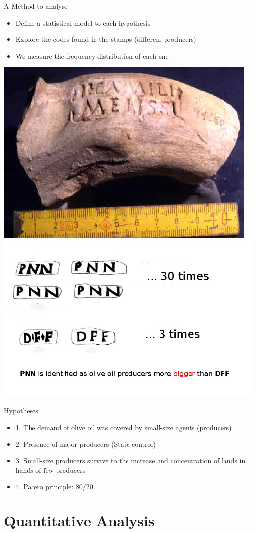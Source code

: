 \documentclass[12pt, handout=show,notes=show]{beamer}
\begin{document}
\begin{frame}{A Method to analyse}
\begin{itemize}
\item Define a statistical model to each hypothesis
\item Explore the codes found in the stamps (different producers) 
\item We measure the frequency distribution of each one   
\end{itemize}

\begin{center}
		\includegraphics[height=0.3\textwidth]{./melissistamp.jpg}
		\hfil \includegraphics[height=0.3\textwidth]{./stamps.jpg}\\
		\vfil
	
\end{center}		
\end{frame}

\begin{frame}{Hypotheses}
\begin{itemize}
\item 1. The demand of olive oil was covered by small-size agents (producers)
\item 2. Presence of major producers (State control)
\item 3. Small-size producers survive to the increase and concentration of lands in hands of few producers
\item 4. Pareto principle: 80/20. 
\end{itemize}
\end{frame}

\section{Quantitative Analysis}
\end{document}
